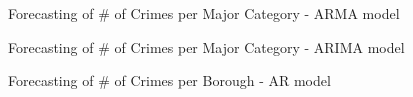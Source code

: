 \documentclass[12pt]{beamer}
\begin{document}
        \begin{frame}{Forecasting of \# of Crimes per Major Category - ARMA model}
            \begin{figure}
                \centering
            \end{figure}
        \end{frame}

        \begin{frame}{Forecasting of \# of Crimes per Major Category - ARIMA model}
            \begin{figure}
                \centering
            \end{figure}
        \end{frame}

        \begin{frame}{Forecasting of \# of Crimes per Borough - AR model}
            \begin{figure}
                \centering
            \end{figure}
        \end{frame}
\end{document}
